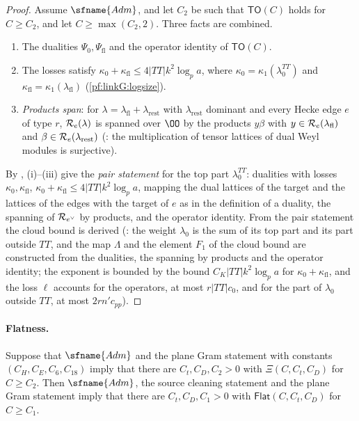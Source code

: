 \begin{proof}
Assume $\sfname{Adm}$, and let $C_2$ be such that $\mathsf{TO}(C)$ holds for $C\ge C_2$, and let $C\ge\max(C_2,2)$. Three facts
are combined.
\begin{enumerate}[label=(\roman*)]
\item The dualities $\Psi_0,\Psi_{\mathrm{fl}}$ and the operator identity of $\mathsf{TO}(C)$.
\item The losses satisfy $\kappa_0+\kappa_{\mathrm{fl}}\le4|TT|k^2\log_pa$, where $\kappa_0=\kappa_1(\lambda_0^{TT})$ and
$\kappa_{\mathrm{fl}}=\kappa_1(\lambda_{\mathrm{fl}})$ (\cref{pf:linkG:logsize}).
\item \emph{Products span}: for $\lambda=\lambda_{\mathrm{fl}}+\lambda_{\mathrm{rest}}$ with $\lambda_{\mathrm{rest}}$ dominant and every Hecke
edge $e$ of type $r$, $\mathcal R_e(\lambda)$ is spanned over $\OO$ by the products $y\beta$ with $y\in\mathcal R_e(\lambda_{\mathrm{fl}})$
and $\beta\in\mathcal R_e(\lambda_{\mathrm{rest}})$ (: the
multiplication of tensor lattices of dual Weyl modules is surjective).
\end{enumerate}
By , (i)--(iii) give the \emph{pair statement} for the
top part $\lambda_0^{TT}$: dualities with losses $\kappa_0,\kappa_{\mathrm{fl}}$, $\kappa_0+\kappa_{\mathrm{fl}}\le4|TT|k^2\log_pa$, mapping
the dual lattices of the target and the lattices of the edges with the target of $e$ as in the definition of a duality,
the spanning of $\mathcal R_{e^\vee}$ by products, and the operator identity. From the pair statement the cloud bound is
derived (: the weight $\lambda_0$ is the sum of its top
part and its part outside $TT$, and the map $\Lambda$ and the element $F_1$ of the cloud bound are constructed from the
dualities, the spanning by products and the operator identity; the exponent is bounded by the bound $C_K|TT|k^2\log_pa$
for $\kappa_0+\kappa_{\mathrm{fl}}$, and the loss $\ell$ accounts for the operators, at most $r|TT|c_0$, and for the part of
$\lambda_0$ outside $TT$, at most $2rn'c_{pp}$).
\end{proof}

\paragraph{Flatness.}

\begin{proposition}\label{pf:linkG:flat}
Suppose that $\sfname{Adm}$ and the plane Gram statement with constants $(C_H,C_E,C_6,C_{18})$ imply that there are
$C_t,C_D,C_2>0$ with $\Xi(C,C_t,C_D)$ for $C\ge C_2$. Then $\sfname{Adm}$, the source cleaning statement and the plane Gram
statement imply that there are $C_t,C_D,C_1>0$ with $\mathsf{Flat}(C,C_t,C_D)$ for $C\ge C_1$.
\end{proposition}

